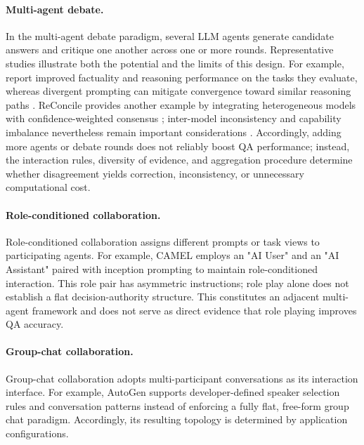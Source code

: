 \documentclass[a4paper,fleqn]{cas-dc}
\begin{document}
\paragraph{Multi-agent debate.}
\label{sec:debate}

In the multi-agent debate paradigm, several LLM agents generate candidate answers and critique one another across one or more rounds. Representative studies illustrate both the potential and the limits of this design. For example, \citet{du2024multiagent_debate} report improved factuality and reasoning performance on the tasks they evaluate, whereas divergent prompting can mitigate convergence toward similar reasoning paths \citep{liang2024divergent_debate}. ReConcile provides another example by integrating heterogeneous models with confidence-weighted consensus \citep{chen2024reconcile}; inter-model inconsistency and capability imbalance nevertheless remain important considerations \citep{xiong2023inter_consistency}. Accordingly, adding more agents or debate rounds does not reliably boost QA performance; instead, the interaction rules, diversity of evidence, and aggregation procedure determine whether disagreement yields correction, inconsistency, or unnecessary computational cost.

\paragraph{Role-conditioned collaboration.}
\label{sec:roleplay}

Role-conditioned collaboration assigns different prompts or task views to participating agents. For example, CAMEL \citep{li2023camel} employs an "AI User" and an "AI Assistant" paired with inception prompting to maintain role-conditioned interaction. This role pair has asymmetric instructions; role play alone does not establish a flat decision-authority structure. This constitutes an adjacent multi-agent framework and does not serve as direct evidence that role playing improves QA accuracy. 

\paragraph{Group-chat collaboration.}
\label{sec:groupchat}

Group-chat collaboration adopts multi-participant conversations as its interaction interface. For example, AutoGen \citep{wu2024autogen} supports developer-defined speaker selection rules and conversation patterns instead of enforcing a fully flat, free-form group chat paradigm. Accordingly, its resulting topology is determined by application configurations. 
\end{document}
